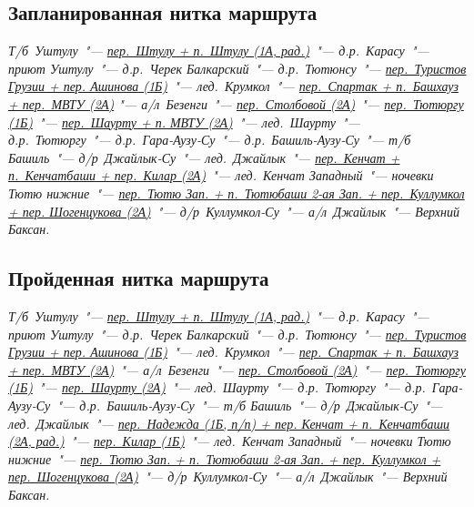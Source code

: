 	\subsection{Запланированная нитка маршрута}\label{subsec:planned_route}
\renewcommand{\bfdefault}{bx}
		\textit{%
			Т/б~Уштулу~"---
			\hyperref[subsec:Day2]{пер.~Штулу + п.~Штулу (1А, рад.)}~"---
			д.р.~Карасу~"---
			приют Уштулу~"---
			д.р.~Черек Балкарский~"---
			д.р.~Тютюнсу~"---
			\hyperref[subsec:Day4]{пер.~Туристов Грузии + пер. Ашинова (1Б)}~"---
			лед.~Крумкол~"---
			\hyperref[subsec:Day6]{пер.~Спартак + п.~Башхауз + пер.~МВТУ (2А)} "---
			а/л~Безенги~"---
			\hyperref[subsec:Day11]{пер.~Столбовой (2А)}~"---
			\hyperref[subsec:Day12]{пер.~Тютюргу (1Б)}~"---
			\hyperref[subsec:Day12]{пер.~Шаурту + п. МВТУ (2А)}~"---
			лед.~Шаурту~"---
			д.р.~Тютюргу~"---
			д.р.~Гара-Аузу-Су~"---
			д.р.~Башиль-Аузу-Су~"---
			т/б Башиль~"---
			д/р~Джайлык-Су~"---
			лед.~Джайлык~"---
			\hyperref[subsec:Day16]{пер.~Кенчат + п.~Кенчатбаши + пер.~Килар (2А)}~"---
			лед.~Кенчат Западный~"---
			ночевки Тютю нижние~"---
			\hyperref[subsec:Day17]{пер.~Тютю Зап. + п.~Тютюбаши 2-ая Зап. + пер.~Куллумкол + пер. Шогенцукова (2А)}~"---
			д/р~Куллумкол-Су~"---
			а/л~Джайлык~"---
			Верхний Баксан.%
		}
	
	\subsection{Пройденная нитка маршрута}\label{subsec:real_route}
		\textit{%
			Т/б~Уштулу~"---
			\hyperref[subsec:Day2]{пер.~Штулу + п.~Штулу (1А, рад.)}~"---
			д.р.~Карасу~"---
			приют Уштулу~"---
			д.р.~Черек Балкарский~"---
			д.р.~Тютюнсу~"---
			\hyperref[subsec:Day4]{пер.~Туристов Грузии + пер. Ашинова (1Б)}~"---
			лед.~Крумкол~"---
			\hyperref[subsec:Day6]{пер.~Спартак + п.~Башхауз + пер.~МВТУ (2А)}~"---
			а/л~Безенги~"---
			\hyperref[subsec:Day11]{пер.~Столбовой (2А)}~"---
			\hyperref[subsec:Day12]{пер.~Тютюргу (1Б)}~"---
			\hyperref[subsec:Day12]{пер.~Шаурту (2А)}~"---
			лед.~Шаурту~"---
			д.р.~Тютюргу~"---
			д.р.~Гара-Аузу-Су~"---
			д.р.~Башиль-Аузу-Су~"---
			т/б Башиль~"---
			д/р~Джайлык-Су~"---
			лед.~Джайлык~"---
			\hyperref[subsec:Day16]{пер.~Надежда (1Б, п/п) + пер. Кенчат + п.~Кенчатбаши (2А, рад.)}~"---
			\hyperref[subsec:Day16]{пер.~Килар (1Б)}~"---
			лед.~Кенчат Западный~"---
			ночевки Тютю нижние~"---
			\hyperref[subsec:Day17]{пер.~Тютю Зап. + п.~Тютюбаши 2-ая Зап. + пер.~Куллумкол + пер.~Шогенцукова (2А)}~"---
			д/р~Куллумкол-Су~"---
			а/л~Джайлык~"---
			Верхний Баксан.%
		}
\renewcommand{\bfdefault}{b}
		
